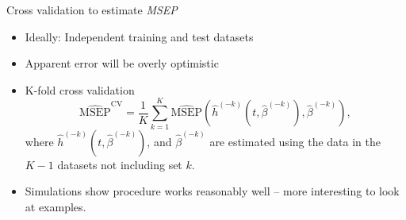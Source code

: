 \documentclass[11pt]{beamer}
\begin{document}
\begin{frame}{Cross validation to estimate \textsl{MSEP}}

\begin{itemize}

\item Ideally: Independent training and test datasets

\item Apparent error will be overly optimistic

\item K-fold cross validation
\begin{equation*}
\widehat{\text{MSEP}}^{\text{CV}} = \frac{1}{K} 
\sum_{k=1}^K \widehat{\text{MSEP}}(\hat{h}^{(-k)}
(t, \hat{\beta}^{(-k)}), \hat{\beta}^{(-k)}),
\end{equation*}
where $\hat{h}^{(-k)}(t, \hat{\beta}^{(-k)})$, 
and $\hat{\beta}^{(-k)}$ are estimated using the data in the $K-1$
datasets not including set $k$.

 \item Simulations show procedure works reasonably well -- more
 interesting to look at examples.

\end{itemize}
\end{frame}
\end{document}
